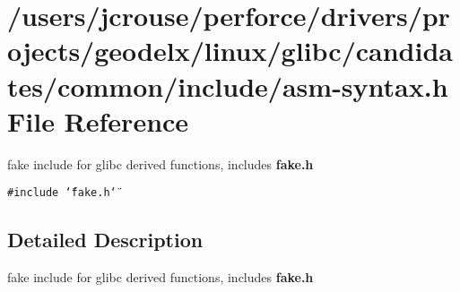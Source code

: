 \section{/users/jcrouse/perforce/drivers/projects/geodelx/linux/glibc/candidates/common/include/asm-syntax.h File Reference}
\label{asm-syntax_8h}
fake include for glibc derived functions, includes {\bf fake.h} 


{\tt \#include \char`\"{}fake.h\char`\"{}}\par


\subsection{Detailed Description}
fake include for glibc derived functions, includes {\bf fake.h}



